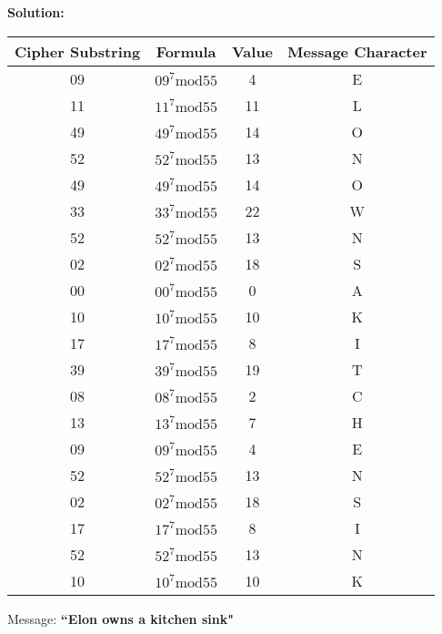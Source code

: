 \documentclass{article}
\newenvironment{solution}
{
\par
\color{blue}
\textbf{Solution:}
}
{
\par
}
\begin{document}
\begin{enumerate}
\begin{solution}
\begin{center}
\begin{tabular}{c|c|c|c}
    Cipher Substring & Formula & Value & Message Character \\ \hline
    09 & $09^7 \text{mod} 55$ & 4 & E\\
    11 & $11^7 \text{mod} 55$ & 11 & L\\
    49 & $49^7 \text{mod} 55$ & 14 & O\\
    52 & $52^7 \text{mod} 55$ & 13 & N\\
    49 & $49^7 \text{mod} 55$ & 14 & O\\
    33 & $33^7 \text{mod} 55$ & 22 & W\\
    52 & $52^7 \text{mod} 55$ & 13 & N\\
    02 & $02^7 \text{mod} 55$ & 18 & S\\
    00 & $00^7 \text{mod} 55$ & 0 & A\\
    10 & $10^7 \text{mod} 55$ & 10 & K\\
    17 & $17^7 \text{mod} 55$ & 8 & I\\
    39 & $39^7 \text{mod} 55$ & 19 & T\\
    08 & $08^7 \text{mod} 55$ & 2 & C\\
    13 & $13^7 \text{mod} 55$ & 7 & H\\
    09 & $09^7 \text{mod} 55$ & 4 & E\\
    52 & $52^7 \text{mod} 55$ & 13 & N\\
    02 & $02^7 \text{mod} 55$ & 18 & S\\
    17 & $17^7 \text{mod} 55$ & 8 & I\\
    52 & $52^7 \text{mod} 55$ & 13 & N\\
    10 & $10^7 \text{mod} 55$ & 10 & K
\end{tabular}
\end{center}

Message: \textbf{``Elon owns a kitchen sink"}

\end{solution}

\end{enumerate}
\end{document}

